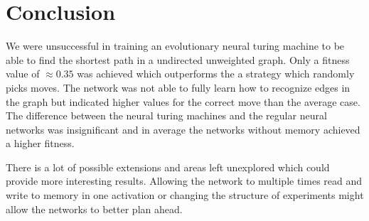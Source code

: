 
\section{Conclusion}
We were unsuccessful in training an evolutionary neural turing machine to be able to find the shortest path in a undirected unweighted graph. Only a fitness value of $\approx0.35 $ was achieved which outperforms the a strategy which randomly picks moves. The network was not able to fully learn how to recognize edges in the graph but indicated higher values for the correct move than the average case. 
The difference between the neural turing machines and the regular neural networks was insignificant and in average the networks without memory achieved a higher fitness. 

There is a lot of possible extensions and areas left unexplored which could provide more interesting results. Allowing the network to multiple times read and write to memory in one activation or changing the structure of experiments might allow the networks to better plan ahead. 